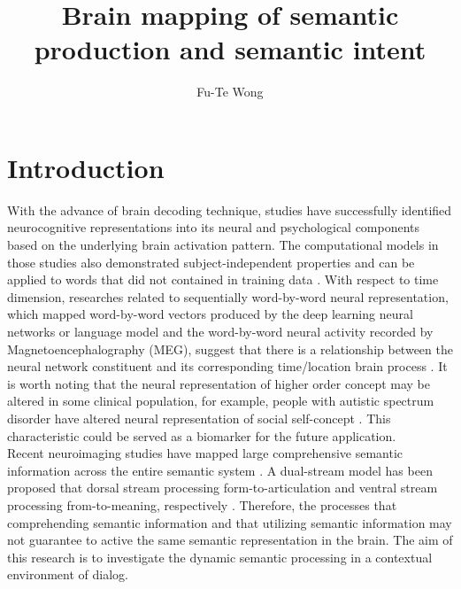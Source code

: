 \documentclass[man, floatsintext, draftfirst]{apa6}
\title{Brain mapping of semantic production and semantic intent}
\author{Fu-Te Wong}
\affiliation{\color{white} .}
\begin{document}
\maketitle



\section*{Introduction}
With the advance of brain decoding technique, studies have successfully identified neurocognitive representations into its neural and psychological components based on the underlying brain activation pattern. The computational models in those studies also demonstrated subject-independent properties and can be applied to words that did not contained in training data \parencites{Mitchell2008}{Just2010}. With respect to time dimension, researches related to sequentially word-by-word neural representation, which mapped word-by-word vectors produced by the deep learning neural networks or language model and the word-by-word neural activity recorded by Magnetoencephalography (MEG), suggest that there is a relationship between the neural network constituent and its corresponding time/location brain process \parencites{LeilaWehbe2014}{Fyshe2016}. It is worth noting that the neural representation of higher order concept may be altered in some clinical population, for example, people with autistic spectrum disorder have altered neural representation of social self-concept \parencite{Just2014}. This characteristic could be served as a biomarker for the future application.\\

Recent neuroimaging studies have mapped large comprehensive semantic information across the entire semantic system \parencite{Huth2016}. A dual-stream model has been proposed that dorsal stream processing form-to-articulation and ventral stream processing from-to-meaning, respectively \parencites{Fridriksson2016}{Hickok2007}. Therefore, the processes that comprehending semantic information and that utilizing semantic information may not guarantee to active the same semantic representation in the brain. The aim of this research is to investigate the dynamic semantic processing in a contextual environment of dialog.\\
\end{document}
